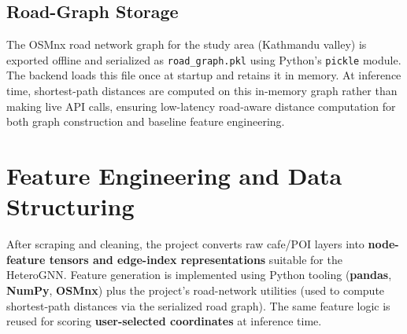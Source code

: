 \subsection{Road-Graph Storage}
The OSMnx road network graph for the study area (Kathmandu valley) is exported offline and serialized as \texttt{road\_graph.pkl} using Python's \texttt{pickle} module. The backend loads this file once at startup and retains it in memory. At inference time, shortest-path distances are computed on this in-memory graph rather than making live API calls, ensuring low-latency road-aware distance computation for both graph construction and baseline feature engineering.


\section{Feature Engineering and Data Structuring}

After scraping and cleaning, the project converts raw cafe/POI layers into \textbf{node-feature tensors and edge-index representations} suitable for the HeteroGNN. Feature generation is implemented using Python tooling (\textbf{pandas}, \textbf{NumPy}, \textbf{OSMnx}) plus the project's road-network utilities (used to compute shortest-path distances via the serialized road graph). The same feature logic is reused for scoring \textbf{user-selected coordinates} at inference time.


